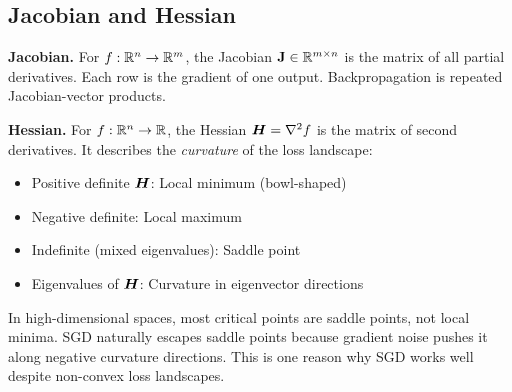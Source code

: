 \begin{interviewq}
\end{interviewq}

\subsection{Jacobian and Hessian}

\textbf{Jacobian.} For $f: \mathbb{R}^n \to \mathbb{R}^m$, the Jacobian $\mathbf{J} \in \mathbb{R}^{m \times n}$ is the matrix of all partial derivatives. Each row is the gradient of one output. Backpropagation is repeated Jacobian-vector products.

\textbf{Hessian.} For $f: \mathbb{R}^n \to \mathbb{R}$, the Hessian $\bm{H} = \nabla^2 f$ is the matrix of second derivatives. It describes the \textit{curvature} of the loss landscape:
\begin{itemize}
    \item Positive definite $\bm{H}$: Local minimum (bowl-shaped)
    \item Negative definite: Local maximum
    \item Indefinite (mixed eigenvalues): Saddle point
    \item Eigenvalues of $\bm{H}$: Curvature in eigenvector directions
\end{itemize}

\begin{keyinsight}
In high-dimensional spaces, most critical points are saddle points, not local minima. SGD naturally escapes saddle points because gradient noise pushes it along negative curvature directions. This is one reason why SGD works well despite non-convex loss landscapes.
\end{keyinsight}

